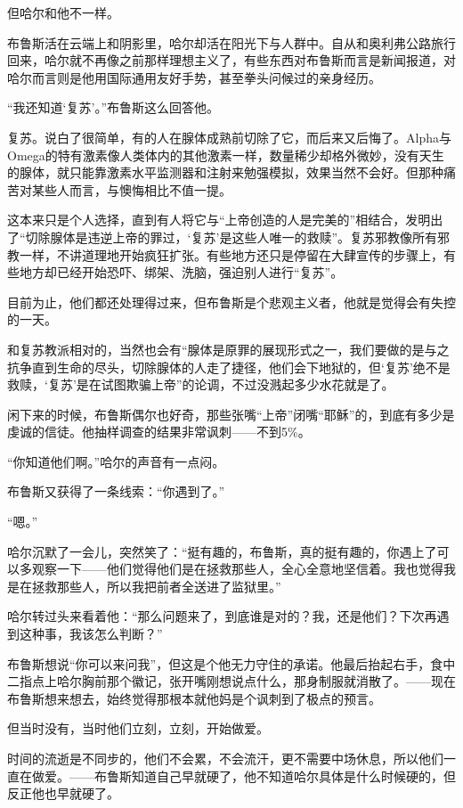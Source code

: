 \documentclass[../main]{subfiles}
\begin{document}
但哈尔和他不一样。

布鲁斯活在云端上和阴影里，哈尔却活在阳光下与人群中。自从和奥利弗公路旅行回来，哈尔就不再像之前那样理想主义了，有些东西对布鲁斯而言是新闻报道，对哈尔而言则是他用国际通用友好手势，甚至拳头问候过的亲身经历。

“我还知道`复苏'。”布鲁斯这么回答他。

复苏。说白了很简单，有的人在腺体成熟前切除了它，而后来又后悔了。Alpha与Omega的特有激素像人类体内的其他激素一样，数量稀少却格外微妙，没有天生的腺体，就只能靠激素水平监测器和注射来勉强模拟，效果当然不会好。但那种痛苦对某些人而言，与懊悔相比不值一提。

这本来只是个人选择，直到有人将它与“上帝创造的人是完美的”相结合，发明出了“切除腺体是违逆上帝的罪过，`复苏'是这些人唯一的救赎”。复苏邪教像所有邪教一样，不讲道理地开始疯狂扩张。有些地方还只是停留在大肆宣传的步骤上，有些地方却已经开始恐吓、绑架、洗脑，强迫别人进行“复苏”。

目前为止，他们都还处理得过来，但布鲁斯是个悲观主义者，他就是觉得会有失控的一天。

和复苏教派相对的，当然也会有“腺体是原罪的展现形式之一，我们要做的是与之抗争直到生命的尽头，切除腺体的人走了捷径，他们会下地狱的，但`复苏'绝不是救赎，`复苏'是在试图欺骗上帝”的论调，不过没溅起多少水花就是了。

闲下来的时候，布鲁斯偶尔也好奇，那些张嘴“上帝”闭嘴“耶稣”的，到底有多少是虔诚的信徒。他抽样调查的结果非常讽刺——不到5\%。

“你知道他们啊。”哈尔的声音有一点闷。

布鲁斯又获得了一条线索：“你遇到了。”

“嗯。”

哈尔沉默了一会儿，突然笑了：“挺有趣的，布鲁斯，真的挺有趣的，你遇上了可以多观察一下——他们觉得他们是在拯救那些人，全心全意地坚信着。我也觉得我是在拯救那些人，所以我把前者全送进了监狱里。”

哈尔转过头来看着他：“那么问题来了，到底谁是对的？我，还是他们？下次再遇到这种事，我该怎么判断？”

布鲁斯想说“你可以来问我”，但这是个他无力守住的承诺。他最后抬起右手，食中二指点上哈尔胸前那个徽记，张开嘴刚想说点什么，那身制服就消散了。——现在布鲁斯想来想去，始终觉得那根本就他妈是个讽刺到了极点的预言。

但当时没有，当时他们立刻，立刻，开始做爱。

时间的流逝是不同步的，他们不会累，不会流汗，更不需要中场休息，所以他们一直在做爱。——布鲁斯知道自己早就硬了，他不知道哈尔具体是什么时候硬的，但反正他也早就硬了。
\end{document}
